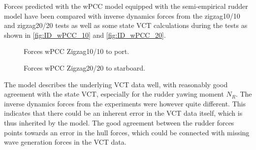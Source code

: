\noindent Forces predicted with the wPCC model equipped with the semi-empirical rudder model have been compared with inverse dynamics forces from the zigzag10/10 and zigzag20/20 tests as well as some state VCT calculations during the tests as shown in \autoref{fig:ID_wPCC_10} and \autoref{fig:ID_wPCC_20}.   
\begin{figure}[h!]
     \centering
     
     \caption{Forces wPCC Zigzag10/10 to port.}
     \label{fig:ID_wPCC_10}
\end{figure}
\begin{figure}[h]
    
    \caption{Forces wPCC Zigzag20/20 to starboard.}
    \label{fig:ID_wPCC_20}
\end{figure}
%         
%         


The model describes the underlying VCT data well, with reasonably good agreement with the state VCT, especially for the rudder yawing moment $N_R$. The inverse dynamics forces from the experiments were however quite different. This indicates that there could be an inherent error in the VCT data itself, which is thus inherited by the model. The good agreement between the rudder forces points towards an error in the hull forces, which could be connected with missing wave generation forces in the VCT data.